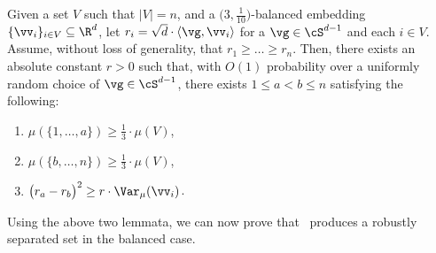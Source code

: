 \documentclass[letterpaper]{article}
\begin{document}
\begin{lemma}
\label{lem.balanced-separated-set}
Given a set $V$ such that $\lvert V \rvert = n$, and a $\big( 3, \frac{1}{10} \big)$-balanced embedding $\{ \vv_i \}_{i \in V} \subseteq \R^d$, let $r_i = \sqrt{d} \cdot \langle \vg, \vv_i \rangle$ for a $\vg \in \cS^{d-1}$ and each $i \in V$. Assume, without loss of generality, that $r_1 \geq \ldots \geq r_n$. Then, there exists an absolute constant $r > 0$ such that, with $O(1)$ probability over a uniformly random choice of $\vg \in \cS^{d-1}$, there exists $1 \leq a < b \leq n$ satisfying the following:
\begin{enumerate}
\item $\mu(\{ 1, \ldots, a \}) \geq \frac{1}{3} \cdot \mu(V)$,

\item $\mu(\{ b, \ldots, n \}) \geq \frac{1}{3} \cdot \mu(V)$,

\item $\big( r_{a} - r_{b} \big)^2 \geq r \cdot \Var_{\mu}(\vv_i)$.
\end{enumerate}
\end{lemma}

Using the above two lemmata, we can now prove that \roundcut~produces a robustly separated set in the balanced case.

\robustSeparatedBalanced*
\end{document}
